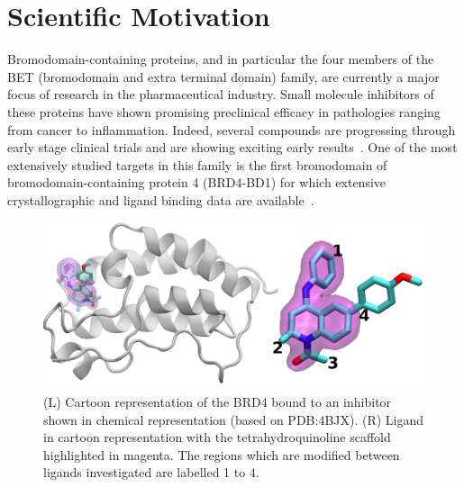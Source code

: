 \documentclass[conference]{IEEEtran}
\begin{document}

\section{Scientific Motivation}\label{sec:motivation}



Bromodomain-containing proteins, and in particular the four members of the BET
(bromodomain and extra terminal domain) family, are currently a major focus of
research in the pharmaceutical industry. Small molecule inhibitors of these
proteins have shown promising preclinical efficacy in pathologies ranging from
cancer to inflammation. Indeed, several compounds are progressing through
early stage clinical trials and are showing exciting early
results~\cite{Theodoulou2016}. One of the most extensively studied targets in
this family is the first bromodomain of bromodomain-containing protein 4
(BRD4-BD1) for which extensive crystallographic and ligand binding data are
available~\cite{Bamborough2012}.

\begin{figure}
  \centering
  \includegraphics[width=1.0\columnwidth]{./brd4.png}
  \caption{(L) Cartoon representation of the BRD4 bound to an inhibitor shown in 
  chemical representation (based on PDB:4BJX). (R) Ligand in cartoon representation 
  with the tetrahydroquinoline scaffold highlighted in magenta. The 
  regions which are modified between ligands investigated are labelled 1 to 4.}
  \label{fig:brd4}
  \vspace{-2em}
\end{figure}
\end{document}
